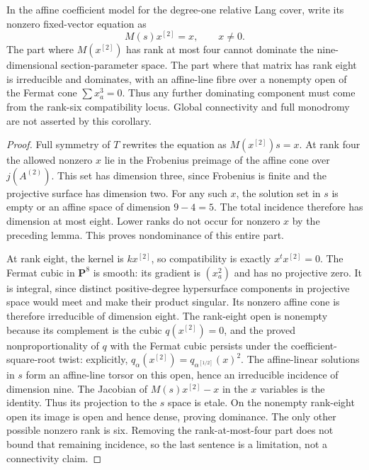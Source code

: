 \begin{corollary}
\label{cor:root-nonordinary-Lang-rank-four-excluded-candidate}
In the affine coefficient model for the degree-one relative Lang
cover, write its nonzero fixed-vector equation as
\[
                    M(s)x^{[2]}=x,\qquad x\ne0.
\]
The part where $M(x^{[2]})$ has rank at most four cannot dominate
the nine-dimensional section-parameter space.
The part where that matrix has rank eight is irreducible and dominates,
with
an affine-line fibre over a nonempty open of the Fermat cone
$\sum x_a^3=0$.
Thus any further dominating component must come from the
rank-six compatibility locus. Global connectivity and full
monodromy are not asserted by this corollary.
\end{corollary}
\begin{proof}
Full symmetry of $T$ rewrites the equation as
$M(x^{[2]})s=x$. At rank four the allowed nonzero $x$ lie in
the Frobenius preimage of the affine cone over $j(A^{(2)})$.
This set has dimension three, since Frobenius is finite and
the projective surface has dimension two. For any such $x$,
the solution set in $s$ is empty or an affine space of dimension
$9-4=5$. The total incidence therefore has dimension at most
eight. Lower ranks do not occur for nonzero $x$ by the preceding
lemma. This proves nondominance of this entire part.

At rank eight, the kernel is $kx^{[2]}$, so compatibility is
exactly $x^t x^{[2]}=0$. The Fermat cubic in $\mathbf P^8$ is
smooth: its gradient is $(x_a^2)$ and has no projective zero.
It is integral, since distinct positive-degree hypersurface
components in projective space would meet and make their product
singular. Its nonzero affine cone is therefore irreducible of
dimension eight. The rank-eight open is nonempty because its
complement is the cubic $q(x^{[2]})=0$, and the proved
nonproportionality of $q$ with the Fermat cubic persists under
the coefficient-square-root twist: explicitly,
$q_\alpha(x^{[2]})=q_{\alpha^{[1/2]}}(x)^2$.
The affine-linear solutions in
$s$ form an affine-line torsor on this open, hence an irreducible
incidence of dimension nine.
The Jacobian of $M(s)x^{[2]}-x$ in the $x$ variables is the identity.
Thus its projection to the $s$ space is etale. On the nonempty
rank-eight open its image is open and hence dense, proving dominance.
The only other possible nonzero rank is six. Removing the
rank-at-most-four part does not bound that remaining incidence,
so the last sentence is a limitation, not a connectivity claim.
\end{proof}
